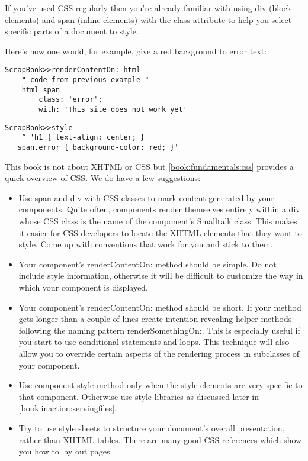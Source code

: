 \documentclass[a4paper,10pt,twoside]{book}
\newcommand{\ct}[1]{{\small\ttfamily\textup{#1}}}
\begin{document}
If you've used CSS regularly then you're already familiar with using \ct{div} (block elements) and \ct{span} (inline elements) with the \ct{class} attribute to help you select specific parts of a document to style.

Here's how one would, for example, give a red background to error text:

\begin{lstlisting}
ScrapBook>>renderContentOn: html
    " code from previous example "
    html span
        class: 'error';
        with: 'This site does not work yet'
\end{lstlisting}

\begin{lstlisting}
ScrapBook>>style
    ^ 'h1 { text-align: center; }
   span.error { background-color: red; }'
\end{lstlisting}

This book is not about XHTML or CSS but \autoref{book:fundamentals:css} provides a quick overview of CSS. We do have a few suggestions:

\begin{itemize}
\item  Use \ct{span} and \ct{div} with CSS classes to mark content generated by your components. Quite often, components render themselves entirely within a \ct{div} whose CSS class is the name of the component's Smalltalk class. This makes it easier for CSS developers to locate the XHTML elements that they want to style. Come up with conventions that work for you and stick to them.
\item  Your component's \ct{renderContentOn:} method should be simple. Do not include style information, otherwise it will be difficult to customize the way in which your component is displayed.
\item  Your component's \ct{renderContentOn:} method should be short. If your method gets longer than a couple of lines create intention-revealing helper methods following the naming pattern \ct{renderSomethingOn:}. This is especially useful if you start to use conditional statements and loops. This technique will also allow you to override certain aspects of the rendering process in subclasses of your component.
\item  Use component \ct{style} method only when the style elements are very specific to that component. Otherwise use style libraries as discussed later in \autoref{book:inaction:servingfiles}.
\item  Try to use style sheets to structure your document's overall presentation, rather than XHTML tables. There are many good CSS references which show you how to lay out pages.
\end{itemize}
\end{document}
